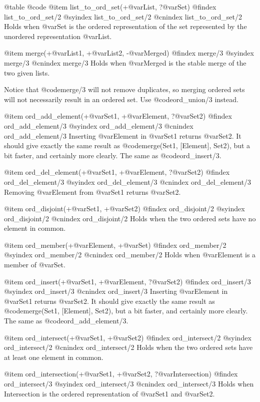 @table @code
@item list_to_ord_set(+@var{List}, ?@var{Set})
@findex list_to_ord_set/2
@syindex list_to_ord_set/2
@cnindex list_to_ord_set/2
Holds when @var{Set} is the ordered representation of the set
represented by the unordered representation @var{List}.

@item merge(+@var{List1}, +@var{List2}, -@var{Merged})
@findex merge/3
@syindex merge/3
@cnindex merge/3
Holds when @var{Merged} is the stable merge of the two given lists.

Notice that @code{merge/3} will not remove duplicates, so merging
ordered sets will not necessarily result in an ordered set. Use
@code{ord_union/3} instead.

@item ord_add_element(+@var{Set1}, +@var{Element}, ?@var{Set2})
@findex ord_add_element/3
@syindex ord_add_element/3
@cnindex ord_add_element/3
Inserting @var{Element} in @var{Set1} returns @var{Set2}.  It should give
exactly the same result as @code{merge(Set1, [Element], Set2)}, but a
bit faster, and certainly more clearly. The same as @code{ord_insert/3}.

@item ord_del_element(+@var{Set1}, +@var{Element}, ?@var{Set2})
@findex ord_del_element/3
@syindex ord_del_element/3
@cnindex ord_del_element/3
Removing @var{Element} from @var{Set1} returns @var{Set2}.

@item ord_disjoint(+@var{Set1}, +@var{Set2})
@findex ord_disjoint/2
@syindex ord_disjoint/2
@cnindex ord_disjoint/2
Holds when the two ordered sets have no element in common.

@item ord_member(+@var{Element}, +@var{Set})
@findex ord_member/2
@syindex ord_member/2
@cnindex ord_member/2
Holds when @var{Element} is a member of @var{Set}.

@item ord_insert(+@var{Set1}, +@var{Element}, ?@var{Set2})
@findex ord_insert/3
@syindex ord_insert/3
@cnindex ord_insert/3
Inserting @var{Element} in @var{Set1} returns @var{Set2}.  It should give
exactly the same result as @code{merge(Set1, [Element], Set2)}, but a
bit faster, and certainly more clearly. The same as @code{ord_add_element/3}.

@item ord_intersect(+@var{Set1}, +@var{Set2})
@findex ord_intersect/2
@syindex ord_intersect/2
@cnindex ord_intersect/2
Holds when the two ordered sets have at least one element in common.

@item ord_intersection(+@var{Set1}, +@var{Set2}, ?@var{Intersection})
@findex ord_intersect/3
@syindex ord_intersect/3
@cnindex ord_intersect/3
Holds when Intersection is the ordered representation of @var{Set1}
and @var{Set2}.

